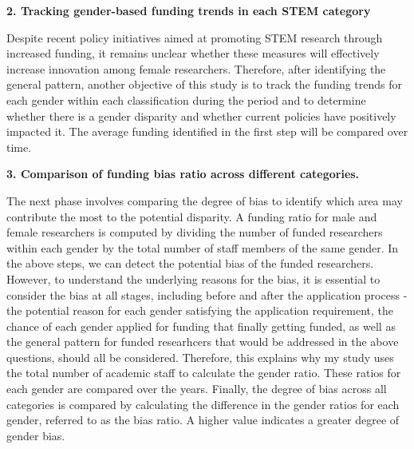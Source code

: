 \textbf{2. Tracking gender-based funding trends in each STEM category}

Despite recent policy initiatives aimed at promoting STEM research through increased funding, it remains unclear whether these measures will effectively increase innovation among female researchers. Therefore, after identifying the general pattern, another objective of this study is to track the funding trends for each gender within each classification during the period and to determine whether there is a gender disparity and whether current policies have positively impacted it. The average funding identified in the first step will be compared over time.

\textbf{3. Comparison of funding bias ratio across different categories.}

The next phase involves comparing the degree of bias to identify which area may contribute the most to the potential disparity. A funding ratio for male and female researchers is computed by dividing the number of funded researchers within each gender by the total number of staff members of the same gender. In the above steps, we can detect the potential bias of the funded researchers. However, to understand the underlying reasons for the bias, it is essential to consider the bias at all stages, including before and after the application process - the potential reason for each gender satisfying the application requirement, the chance of each gender applied for funding that finally getting funded, as well as the general pattern for funded researhcers that would be addressed in the above questions, should all be considered. Therefore, this explains why my study uses the total number of academic staff to calculate the gender ratio. These ratios for each gender are compared over the years. Finally, the degree of bias across all categories is compared by calculating the difference in the gender ratios for each gender, referred to as the bias ratio. A higher value indicates a greater degree of gender bias.



